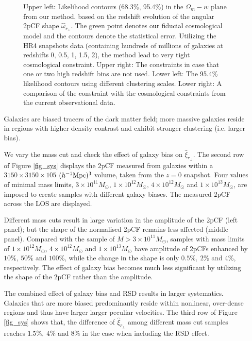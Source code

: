 \documentclass[iop]{emulateapj}
\begin{document}
\begin{figure}
{   }
   \caption{\label{fig_contours}
   Upper left: Likelihood contours (68.3\%, 95.4\%) in the $\Omega_m-w$ plane from our method, 
   based on the redshift evolution of the angular 2pCF shape $\hat\omega_{r_\perp}$.
   The green point denotes our fiducial cosmological model and the contours denote the statistical error.
   Utilizing the HR4 snapshots data (containing hundreds of millions of galaxies at redshifts 0, 0.5, 1, 1.5, 2),
   the method lead to very tight cosmological constraint.
   Upper right: The constraints in case that one or two high redshift bins are not used.
   Lower left: The 95.4\% likelihood contours using different clustering scales.
   Lower right: A comparison of the constraint with the cosmological constraints from the current observational data.
   }
\end{figure}

Galaxies are biased tracers of the dark matter field;
more massive galaxies reside in regions with higher density contrast
and exhibit stronger clustering (i.e. larger bias).

We vary the mass cut and check the effect of galaxy bias on $\hat \xi_{r_\perp}$.
The second row of Figure \ref{fig_sys} displays the 2pCF measured from galaxies within a $3150\times3150\times105$ $(h^{-1}\rm Mpc)^3$ volume, taken from the $z=0$ snapshot.
Four values of minimal mass limits, $3\times 10^{11} M_{\odot}$, $1\times 10^{12} M_{\odot}$, $4\times 10^{12} M_{\odot}$ and $1\times 10^{13} M_{\odot}$,
are imposed to create samples with different galaxy biases.
The measured 2pCF across the LOS are displayed.

Different mass cuts result in large variation in the amplitude of the 2pCF (left panel);
but the shape of the normalised 2pCF remains less affected (middle panel).
Compared with the sample of $M>3\times 10^{11} M_{\odot}$,
samples with mass limits of $1\times 10^{12} M_{\odot}$, $4\times 10^{12} M_{\odot}$ and $1\times 10^{13} M_{\odot}$
have amplitude of 2pCFs enhanced by $10\%,\ 50\%$ and $100\%$, 
while the change in the shape is only $0.5\%,\ 2\%$ and $4\%$, respectively.
The effect of galaxy bias becomes much less significant by utilizing the shape of the 2pCF rather than the amplitude.

The combined effect of galaxy bias and RSD results in larger systematics.
Galaxies that are more biased predominantly reside within nonlinear, over-dense regions and thus have larger larger peculiar velocities.
The third row of Figure \ref{fig_sys} shows that, 
the difference of $\hat \xi_{r_\perp}$ among different mass cut samples reaches $1.5\%,\ 4\%$ and $8\%$ in the case when including the RSD effect.
\end{document}
